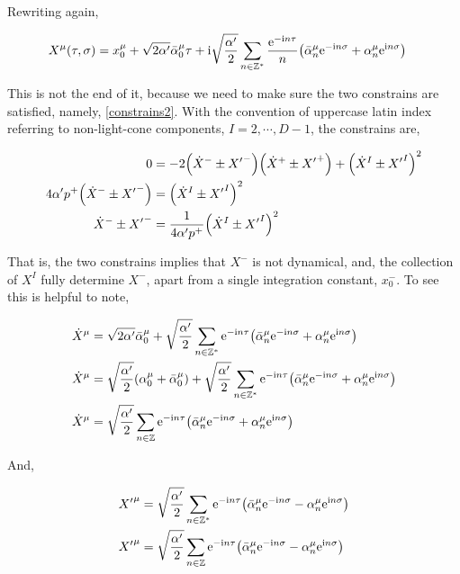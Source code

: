 Rewriting again,

\begin{align*}
    X^\mu\qty(\tau,\sigma)&=x_{0}^\mu+\sqrt{2\alpha'}{\bar\alpha}_0^\mu\tau+\textnormal{i}\sqrt{\frac{\alpha'}{2}}\sum\limits_{n\in\mathbb Z^\ast}\frac{\textnormal{e}^{-\textnormal{i} n\tau}}{n}\qty({\bar\alpha}^\mu_n\textnormal{e}^{-\textnormal{i} n\sigma}+{\alpha}^\mu_n\textnormal{e}^{\textnormal{i} n\sigma})
\end{align*}

This is not the end of it, because we need to make sure the two constrains are satisfied, namely, \ref{constrains2}. With the convention of 
uppercase latin index referring to non-light-cone components, $I=2,\cdots,D-1$, the constrains are,

\begin{align*}
    0&=-2\qty({\dot X}^-\pm{X'}^-)\qty({\dot X}^+\pm{X'}^+)+\qty({\dot X}^I\pm{X'}^I)^2\\
    4\alpha'p^+\qty({\dot X}^-\pm{X'}^-)&=\qty({\dot X}^I\pm{X'}^I)^2\\
    {\dot X}^-\pm{X'}^-&=\frac{1}{4\alpha'p^+}\qty({\dot X}^I\pm{X'}^I)^2
\end{align*}

That is, the two constrains implies that $X^-$ is not dynamical, and, the collection of $X^I$ fully determine $X^-$, 
apart from a single integration constant, $x_0^-$. To see this is helpful to note,

\begin{align*}
    {\dot X}^\mu&=\sqrt{2\alpha'}{\bar\alpha}_0^\mu+\sqrt{\frac{\alpha'}{2}}\sum\limits_{n\in\mathbb Z^\ast}\textnormal{e}^{-\textnormal{i} n\tau}\qty({\bar\alpha}^\mu_n\textnormal{e}^{-\textnormal{i} n\sigma}+{\alpha}^\mu_n\textnormal{e}^{\textnormal{i} n\sigma})\\
    {\dot X}^\mu&=\sqrt{\frac{\alpha'}{2}}\qty(\alpha_0^\mu+{\bar\alpha}_0^\mu)+\sqrt{\frac{\alpha'}{2}}\sum\limits_{n\in\mathbb Z^\ast}\textnormal{e}^{-\textnormal{i} n\tau}\qty({\bar\alpha}^\mu_n\textnormal{e}^{-\textnormal{i} n\sigma}+{\alpha}^\mu_n\textnormal{e}^{\textnormal{i} n\sigma})\\
    {\dot X}^\mu&=\sqrt{\frac{\alpha'}{2}}\sum\limits_{n\in\mathbb Z}\textnormal{e}^{-\textnormal{i} n\tau}\qty({\bar\alpha}^\mu_n\textnormal{e}^{-\textnormal{i} n\sigma}+{\alpha}^\mu_n\textnormal{e}^{\textnormal{i} n\sigma})
\end{align*}

And,

\begin{align*}
    {X'}^\mu&=\sqrt{\frac{\alpha'}{2}}\sum\limits_{n\in\mathbb Z^\ast}\textnormal{e}^{-\textnormal{i} n\tau}\qty({\bar\alpha}^\mu_n\textnormal{e}^{-\textnormal{i} n\sigma}-{\alpha}^\mu_n\textnormal{e}^{\textnormal{i} n\sigma})\\
    {X'}^\mu&=\sqrt{\frac{\alpha'}{2}}\sum\limits_{n\in\mathbb Z}\textnormal{e}^{-\textnormal{i} n\tau}\qty({\bar\alpha}^\mu_n\textnormal{e}^{-\textnormal{i} n\sigma}-{\alpha}^\mu_n\textnormal{e}^{\textnormal{i} n\sigma})
\end{align*}

